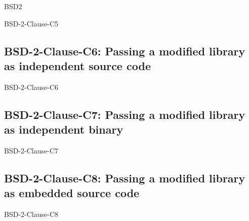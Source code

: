 \begin{license}{BSD2}
\begin{lsuc}{BSD-2-Clause-C5}
  \lsucprohibitsnothing
\end{lsuc}

\subsection{BSD-2-Clause-C6: Passing a modified library as independent source code}
\begin{lsuc}{BSD-2-Clause-C6}

  \lsucmeans{\useCaseSix}
  \lsuccovers{\coversSix}

  \begin{lsucrequires}
    \lsucmandatory{\keepLicenseElements}
  \end{lsucrequires}

  \lsucprohibitsnothing
\end{lsuc}

\subsection{BSD-2-Clause-C7: Passing a modified library as independent binary}
\begin{lsuc}{BSD-2-Clause-C7}

  \lsucmeans{\useCaseSeven}
  \lsuccovers{\coversSeven}

  \begin{lsucrequires}
    \lsucmandatory{\insertLicenseIntoBinary}\passingFilesCorrectly
  \end{lsucrequires}

  \lsucprohibitsnothing
\end{lsuc}

\subsection{BSD-2-Clause-C8: Passing a modified library as embedded source code}
\begin{lsuc}{BSD-2-Clause-C8}

  \lsucmeans{\useCaseEight}
  \lsuccovers{\coversEight}

  \begin{lsucrequires}
    \lsucmandatory{\keepLicenseElements}
    \lsucoptional{\addLibraryLicenseToCopyrightMessage}
    \lsucoptional{\keepSourcesSeparate}
  \end{lsucrequires}


\end{lsuc}
\end{license}
